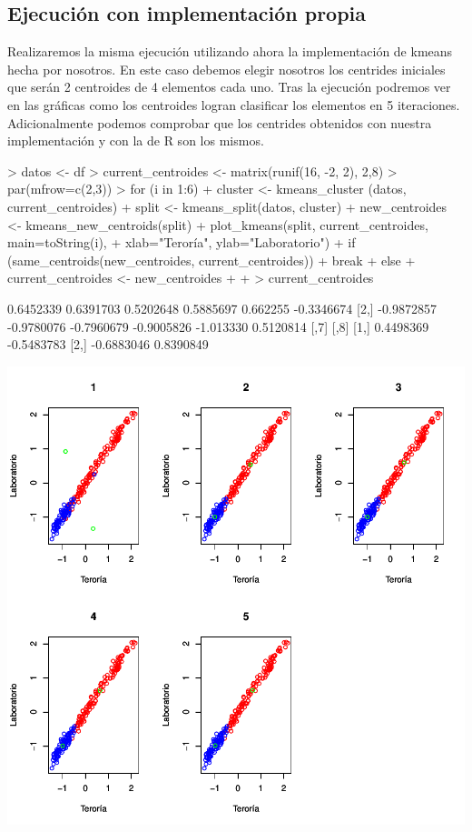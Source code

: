 \documentclass [a4paper] {article}
\begin{document}
\subsection{Ejecución con implementación propia}
Realizaremos la misma ejecución utilizando ahora la implementación de kmeans hecha por nosotros.
En este caso debemos elegir nosotros los centrides iniciales que serán 2 centroides de 4 elementos cada uno.
Tras la ejecución podremos ver en las gráficas como los centroides logran clasificar los elementos en 5 iteraciones.
Adicionalmente podemos comprobar que los centrides obtenidos con nuestra implementación y con la de R son los mismos.
\begin{center}
\begin{Schunk}
\begin{Sinput}
> datos <- df
> current_centroides <- matrix(runif(16, -2, 2), 2,8)
> par(mfrow=c(2,3))
> for (i in 1:6){
+   cluster <- kmeans_cluster (datos, current_centroides)
+   split <- kmeans_split(datos, cluster)
+   new_centroides <- kmeans_new_centroids(split)
+   plot_kmeans(split, current_centroides, main=toString(i),
+               xlab="Teroría", ylab="Laboratorio")
+   if (same_centroids(new_centroides, current_centroides)){
+     break
+   }else{
+     current_centroides <- new_centroides
+   }
+ }
> current_centroides
\end{Sinput}
\begin{Soutput}
           [,1]       [,2]       [,3]       [,4]      [,5]       [,6]
[1,]  0.6452339  0.6391703  0.5202648  0.5885697  0.662255 -0.3346674
[2,] -0.9872857 -0.9780076 -0.7960679 -0.9005826 -1.013330  0.5120814
           [,7]       [,8]
[1,]  0.4498369 -0.5483783
[2,] -0.6883046  0.8390849
\end{Soutput}
\end{Schunk}
\includegraphics{entrega-kmeans_our_implementation}
\end{center}
\end{document}
